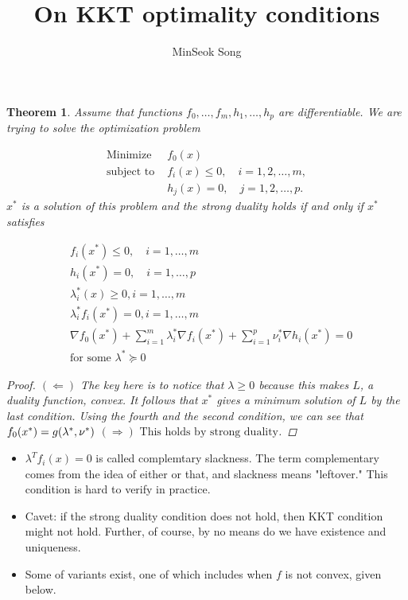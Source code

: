 \documentclass{article}
\title{On KKT optimality conditions}
\author{MinSeok Song}
\date{}
\newtheorem{theorem}{Theorem}
\theoremstyle{remark}
\begin{document}
\maketitle

\begin{theorem}
Assume that functions $f_0,\dots,f_m,h_1,\dots,h_p$ are differentiable. We
 are trying to solve the optimization problem

\begin{align*}
        \text{Minimize } & f_0(x) \\
        \text{subject to } & f_i(x) \leq 0, \quad i = 1, 2, \ldots, m, \\
        & h_j(x) = 0, \quad j = 1, 2, \ldots, p.
        \end{align*}
$x^*$ is a solution of this problem and the strong duality holds if and only if $x^*$ satisfies

\begin{align*}
        & f_i (x^*)\leq 0,\quad i=1,\dots,m\\
        & h_i(x^*)=0,\quad i=1,\dots ,p\\
        & \lambda_i^*(x)\geq 0,i=1,\dots,m\\
        &\lambda_i^* f_i(x^*)=0,i=1,\dots,m\\
        &\nabla f_0(x^*)+\sum^m_{i=1}\lambda_i^*\nabla f_i(x^*)+\sum^p_{i=1}\nu_i^* \nabla h_i(x^*)=0\\
        & \text{for some } \lambda^*\succeq 0
\end{align*}

\begin{proof}
        $(\Leftarrow)$ The key here is to notice that 
        $\lambda \geq 0$ because this makes $L$, a duality function, convex.
        It follows that $x^*$ gives a minimum solution of $L$ by the last condition.
        Using the fourth and the second condition, we can see that 
        $f_0(x^*)=g(\lambda^*,\nu^*)\\\\$
        $(\Rightarrow) \text{ This holds by strong duality}$. 
        \end{proof}
\end{theorem}
\begin{itemize}
\item $\lambda^T f_i(x)=0$ is called complemtary slackness. The term complementary
 comes from the idea of either or that, and slackness means "leftover." This condition is
  hard to verify in practice.
\item Cavet: if the strong duality condition does not hold, then
KKT condition might not hold. Further, of course, by no means do we have existence and uniqueness.
\item Some of variants exist, one of which includes when $f$ is not convex, given below.
\end{itemize}
\end{document}
